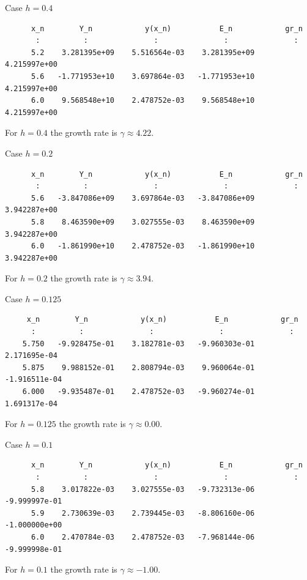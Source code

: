 \documentclass[a4paper]{article}
\begin{document}
Case $h=0.4$
\begin{table}[H]
\centering
\begin{verbatim}
      x_n        Y_n            y(x_n)           E_n            gr_n 
       :          :               :               :               : 
      5.2    3.281395e+09    5.516564e-03    3.281395e+09    4.215997e+00
      5.6   -1.771953e+10    3.697864e-03   -1.771953e+10    4.215997e+00
      6.0    9.568548e+10    2.478752e-03    9.568548e+10    4.215997e+00
\end{verbatim}
\caption{For $h=0.4$ the growth rate is $\gamma \approx 4.22$.}
\end{table}

Case $h=0.2$
\begin{table}[H]
\centering
\begin{verbatim}
      x_n        Y_n            y(x_n)           E_n            gr_n 
       :          :               :               :               : 
      5.6   -3.847086e+09    3.697864e-03   -3.847086e+09    3.942287e+00
      5.8    8.463590e+09    3.027555e-03    8.463590e+09    3.942287e+00
      6.0   -1.861990e+10    2.478752e-03   -1.861990e+10    3.942287e+00
\end{verbatim}
\caption{For $h=0.2$ the growth rate is $\gamma \approx 3.94$.}
\end{table}

Case $h=0.125$
\begin{table}[H]
\centering
\begin{verbatim}
     x_n        Y_n            y(x_n)           E_n            gr_n 
      :          :               :               :               : 
    5.750   -9.928475e-01    3.182781e-03   -9.960303e-01    2.171695e-04
    5.875    9.988152e-01    2.808794e-03    9.960064e-01   -1.916511e-04
    6.000   -9.935487e-01    2.478752e-03   -9.960274e-01    1.691317e-04
\end{verbatim}
\caption{For $h=0.125$ the growth rate is $\gamma \approx 0.00$.}
\end{table}

Case $h=0.1$
\begin{table}[H]
\centering
\begin{verbatim}
      x_n        Y_n            y(x_n)           E_n            gr_n 
       :          :               :               :               : 
      5.8    3.017822e-03    3.027555e-03   -9.732313e-06   -9.999997e-01
      5.9    2.730639e-03    2.739445e-03   -8.806160e-06   -1.000000e+00
      6.0    2.470784e-03    2.478752e-03   -7.968144e-06   -9.999998e-01
\end{verbatim}
\caption{For $h=0.1$ the growth rate is $\gamma \approx -1.00$.}
\end{table}
\end{document}
